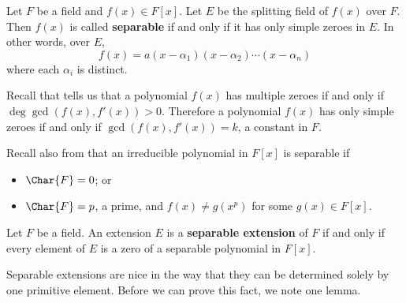 \begin{definition}
    Let $F$ be a field and $f(x) \in F[x]$. Let $E$ be the splitting field of $f(x)$ over $F$. Then $f(x)$ is called \textbf{separable} if and only if it has only simple zeroes in $E$. In other words, over $E$,
    \[
        f(x) = a(x-\alpha_1)(x-\alpha_2)\cdots(x-\alpha_n)
    \]
    where each $\alpha_i$ is distinct.
\end{definition}

Recall that  tells us that a polynomial $f(x)$ has multiple zeroes if and only if $\deg \gcd(f(x), f'(x)) > 0$. Therefore a polynomial $f(x)$ has only simple zeroes if and only if $\gcd(f(x), f'(x)) = k$, a constant in $F$.

Recall also from  that an irreducible polynomial in $F[x]$ is separable if
\begin{itemize}
    \item $\Char{F} = 0$; or
    \item $\Char{F} = p$, a prime, and $f(x) \neq g(x^p)$ for some $g(x) \in F[x]$.
\end{itemize}

\begin{definition}
    Let $F$ be a field. An extension $E$ is a \textbf{separable extension} of $F$ if and only if every element of $E$ is a zero of a separable polynomial in $F[x]$.
\end{definition}

Separable extensions are nice in the way that they can be determined solely by one primitive element. Before we can prove this fact, we note one lemma.

